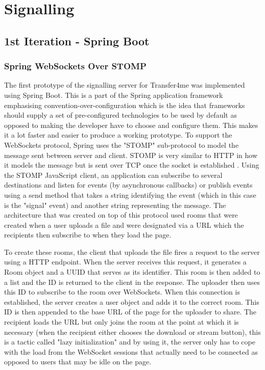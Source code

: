 \documentclass[]{report}
\begin{document}
		\section{Signalling}
			\subsection{1st Iteration - Spring Boot}
				\subsubsection*{Spring WebSockets Over STOMP}
				The first prototype of the signalling server for Transfer4me was implemented using Spring Boot. This is a part of the Spring application framework emphasising convention-over-configuration which is the idea that frameworks should supply a set of pre-configured technologies to be used by default as opposed to making the developer have to choose and configure them. This makes it a lot faster and easier to produce a working prototype. To support the WebSockets protocol, Spring uses the "STOMP" sub-protocol to model the message sent between server and client. STOMP is very similar to HTTP in how it models the message but is sent over TCP once the socket is established \cite{STOMP}. Using the STOMP JavaScript client, an application can subscribe to several destinations and listen for events (by asynchronous callbacks) or publish events using a send method that takes a string identifying the event (which in this case is the "signal" event) and another string representing the message. The architecture that was created on top of this protocol used rooms that were created when a user uploads a file and were designated via a URL which the recipients then subscribe to when they load the page.

				To create these rooms, the client that uploads the file fires a request to the server using a HTTP endpoint. When the server receives this request, it generates a Room object and a UUID that serves as its identifier. This room is then added to a list and the ID is returned to the client in the response. The uploader then uses this ID to subscribe to the room over WebSockets. When this connection is established, the server creates a user object and adds it to the correct room. This ID is then appended to the base URL of the page for the uploader to share. The recipient loads the URL but only joins the room at the point at which it is necessary (when the recipient either chooses the download or stream button), this is a tactic called "lazy initialization" and by using it, the server only has to cope with the load from the WebSocket sessions that actually need to be connected as opposed to users that may be idle on the page.
				
\end{document}
